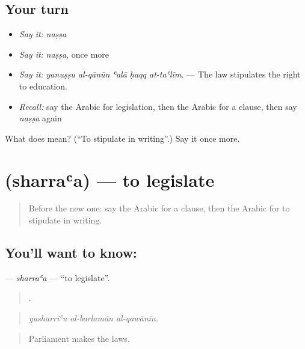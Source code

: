 \subsection*{Your turn}
\begin{itemize}
\raggedright
  \item \emph{Say it:} \emph{naṣṣa}
  \item \emph{Say it:} \emph{naṣṣa}, once more
  \item \emph{Say it:} \emph{yanuṣṣu al-qānūn ʿalā ḥaqq at-taʿlīm.} — The law stipulates the right to education.
  \item \emph{Recall:} say the Arabic for legislation, then the Arabic for a clause, then say \emph{naṣṣa} again
\end{itemize}

\begin{tcolorbox}[breakable,colback=teal!4,colframe=teal!35!black,title={Before you move on}]
What does  mean? (\textquotedblleft{}To stipulate in writing\textquotedblright{}.) Say it once more.
\end{tcolorbox}
\section[\texorpdfstring{\ar{شرع} (sharraʿa)}{شرع (sharraʿa)}]{ (sharraʿa) — to legislate}

\label{lesson:AR-C409-sharraa}



\begin{quote}
Before the new one: say the Arabic for a clause, then the Arabic for to stipulate in writing.
\end{quote}

\subsection*{You'll want to know: }
\textbf{} — \emph{sharraʿa} — \textquotedblleft{}to legislate\textquotedblright{}.

\begin{quote}
  .
\end{quote}

\begin{quote}
\emph{yusharriʿu al-barlamān al-qawānīn.}
\end{quote}

\begin{quote}
Parliament makes the laws.
\end{quote}

